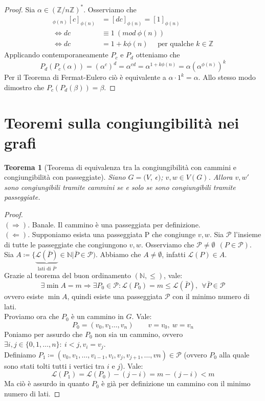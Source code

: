 \documentclass[12pt,twoscolu]{article}
\newcommand{\N}{\mathbb{N}}
\newcommand{\Z}{\mathbb{Z}}
\newcommand{\sesolose}{\Leftrightarrow}
\newcommand{\implica}{\Longrightarrow}
\newcommand{\pq}{\text{ per qualche }}
\newcommand{\znz}{\displaystyle({\Z}/{n\Z})^*}
\newcommand{\Eps}{${\Large$\epsilon$}$}
\newcommand{\grafo}{(V, \: \Eps)}
\newtheorem{theorem}{Teorema}
\begin{document}
\begin{proof}
Sia $\alpha \in \znz$. Osserviamo che 
\begin{align*}
[d]_{\phi(n)}[c]_{\phi(n)} &= [dc]_{\phi(n)} = [1]_{\phi(n)} \\
\sesolose dc &\equiv 1 \ (mod \ \phi(n)) \\
\sesolose dc &= 1 + k\phi(n)\quad \pq k \in \Z
\end{align*}
Applicando contemporaneamente $P_c$ e $P_d$ otteniamo che 
$$ P_d(P_c(\alpha)) = (\alpha^c)^d = \alpha^{cd} = \alpha^{1+k\phi(n)} = \alpha(\alpha^{\phi(n)})^{k} $$
Per il Teorema di Fermat-Eulero ciò è equivalente a $\alpha \cdot 1^k = \alpha$. Allo stesso modo dimostro che $P_c(P_d(\beta)) = \beta$.
\end{proof}

\section{Teoremi sulla congiungibilità nei grafi}
\begin{theorem}[Teorema di equivalenza tra la congiungibilità con cammini e congiungibilità con passeggiate]
Siano $G = \grafo$; $v, w \in V(G)$. Allora $v, w'$ sono congiungibili tramite cammini se e solo se sono congiungibili tramite passeggiate.
\end{theorem}

\begin{proof}\ \\
$(\implica)$. Banale. Il cammino è una passeggiata per definizione.\\
$(\Longleftarrow)$. Supponiamo esista una passeggiata P che congiunge $v, w$. Sia $\mathcal{P}$ l'insieme di tutte le passeggiate che congiungono $v, w$. Osserviamo che $\mathcal{P} \ne \emptyset \ \ (P \in \mathcal{P})$.\\
Sia $A \coloneqq \{ \underbrace{\mathcal{L}(\bar{P})}_{\text{lati di $\bar{P}$}} \in \N | \bar{P} \in \mathcal{P})$. Abbiamo che $A \ne \emptyset$, infatti $\mathcal{L}(P) \in A$.\\
Grazie al teorema del buon ordinamento $(\N, \le)$, vale:
$$ \exists \min A = m \implica \exists P_0 \in \mathcal{P} : \mathcal{L}(P_0) = m \le \mathcal{L}(\bar{P}),\ \ \forall \bar{P} \in \mathcal{P}$$
ovvero esiste $\min A$, quindi esiste una passeggiata $\mathcal{P}$ con il minimo numero di lati.\\
Proviamo ora che $P_0$ è un cammino in $G$. Vale:
$$ P_0 = (v_0, v_1\ldots, v_n)\qquad v = v_0,\ w = v_n$$
Poniamo per assurdo che $P_0$ non sia un cammino, ovvero $\exists i, j \in \{0, 1,\ldots, n\} : \ i < j, v_i = v_j$.\\
Definiamo $P_1 \coloneqq (v_0, v_1, \ldots , v_{i-1}, v_i, v_j, v_{j+1},\ldots, vn) \in \mathcal{P}$ (ovvero $P_0$ alla quale sono stati tolti tutti i vertici tra $i$ e $j$). Vale:
$$\mathcal{L}(P_1) = \mathcal{L}(P_0) - (j - i) = m - (j - i) < m$$
Ma ciò è assurdo in quanto $P_0$ è già per definizione un cammino con il minimo numero di lati.
\end{proof}
\end{document}
